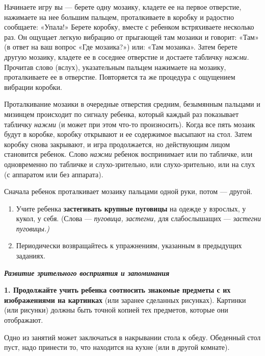 \documentclass{book}
\renewcommand{\emph}[1]{\textit{#1}}
\begin{document}
Начинаете игру вы --- берете одну мозаику, кладете ее на первое
отверстие, нажимаете на нее большим пальцем, проталкиваете в коробку и
радостно сообщаете: «Упала!» Берете коробку, вместе с ребенком
встряхиваете несколько раз. Он ощущает легкую вибрацию от прыгающей там
мозаики и говорит: «Там» (в ответ на ваш вопрос «Где мозаика?») или:
«Там мозаика». Затем берете другую мозаику, кладете ее в соседнее
отверстие и достаете табличку \emph{нажми.} Прочитав слово (вслух),
указательным пальцем нажимаете на мозаику, проталкиваете ее в отверстие.
Повторяется та же процедура с ощущением вибрации коробки.

Проталкивание мозаики в очередные отверстия средним, безымянным пальцами
и мизинцем происходит по сигналу ребенка, который каждый раз показывает
табличку \emph{нажми} (и может при этом что-то произносить). Когда все
пять мозаик будут в коробке, коробку открывают и ее содержимое высыпают
на стол. Затем коробку снова закрывают, и игра продолжается, но
действующим лицом становится ребенок. Слово \emph{нажми} ребенок
воспринимает или по табличке, или одновременно по табличке и
слухо-зрительно, или слухо-зрительно, или на слух (с аппаратом или без
аппарата).

Сначала ребенок проталкивает мозаику пальцами одной руки, потом ---
другой.


\begin{enumerate}
\def\labelenumi{\arabic{enumi}.}
\setcounter{enumi}{7}
\item
  
  Учите ребенка \textbf{застегивать крупные пуговицы} на одежде у
  взрослых, у кукол, у себя. (Слова --- \emph{пуговица, застегни,} для
  слабослышащих --- \emph{застегни пуговицы.)}
  
\item
  
  Периодически возвращайтесь к упражнениям, указанным в предыдущих
  заданиях.
  
\end{enumerate}


\emph{\textbf{Развитие зрительного восприятия и запоминания}}

\textbf{1. Продолжайте учить ребенка соотносить знакомые предметы с их
изображениями на картинках} (или заранее сделанных рисунках). Картинки
(или рисунки) должны быть точной копией тех предметов, которые они
отображают.

Одно из занятий может заключаться в накрывании стола к обеду. Обеденный
стол пуст, надо принести то, что находится на кухне (или в другой
комнате).
\end{document}
